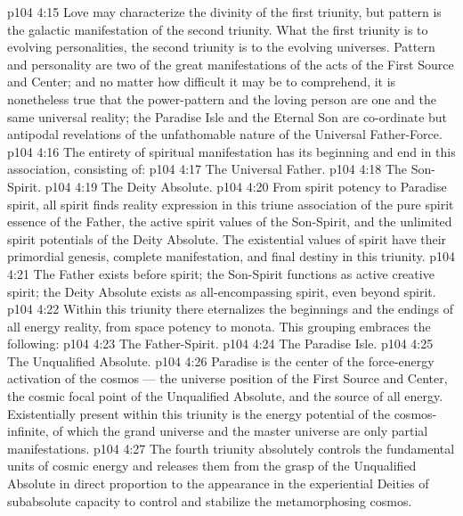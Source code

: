 \vs p104 4:15 Love may characterize the divinity of the first triunity, but pattern is the galactic manifestation of the second triunity. What the first triunity is to evolving personalities, the second triunity is to the evolving universes. Pattern and personality are two of the great manifestations of the acts of the First Source and Center; and no matter how difficult it may be to comprehend, it is nonetheless true that the power\hyp{}pattern and the loving person are one and the same universal reality; the Paradise Isle and the Eternal Son are co\hyp{}ordinate but antipodal revelations of the unfathomable nature of the Universal Father\hyp{}Force.
\vs p104 4:16 \pc {} The entirety of spiritual manifestation has its beginning and end in this association, consisting of:
\vs p104 4:17 \bibnobreakspace The Universal Father.
\vs p104 4:18 \bibnobreakspace The Son\hyp{}Spirit.
\vs p104 4:19 \bibnobreakspace The Deity Absolute.
\vs p104 4:20 \pc From spirit potency to Paradise spirit, all spirit finds reality expression in this triune association of the pure spirit essence of the Father, the active spirit values of the Son\hyp{}Spirit, and the unlimited spirit potentials of the Deity Absolute. The existential values of spirit have their primordial genesis, complete manifestation, and final destiny in this triunity.
\vs p104 4:21 The Father exists before spirit; the Son\hyp{}Spirit functions as active creative spirit; the Deity Absolute exists as all\hyp{}encompassing spirit, even beyond spirit.
\vs p104 4:22 \pc {} Within this triunity there eternalizes the beginnings and the endings of all energy reality, from space potency to monota. This grouping embraces the following:
\vs p104 4:23 \bibnobreakspace The Father\hyp{}Spirit.
\vs p104 4:24 \bibnobreakspace The Paradise Isle.
\vs p104 4:25 \bibnobreakspace The Unqualified Absolute.
\vs p104 4:26 \pc Paradise is the center of the force\hyp{}energy activation of the cosmos --- the universe position of the First Source and Center, the cosmic focal point of the Unqualified Absolute, and the source of all energy. Existentially present within this triunity is the energy potential of the cosmos\hyp{}infinite, of which the grand universe and the master universe are only partial manifestations.
\vs p104 4:27 The fourth triunity absolutely controls the fundamental units of cosmic energy and releases them from the grasp of the Unqualified Absolute in direct proportion to the appearance in the experiential Deities of subabsolute capacity to control and stabilize the metamorphosing cosmos.
